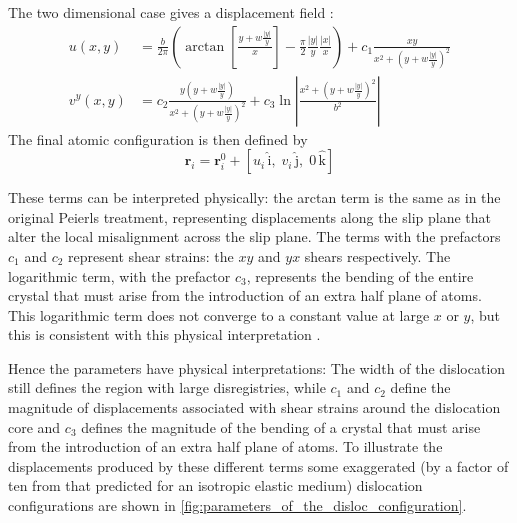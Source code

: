 The two dimensional case gives a displacement field \cite{Eshelby1949,Leibfried1949,nabarro1987theory}:
\begin{subequations}\label{eqn:displacements}
\begin{align}
u(x,y) &= \frac{b}{2\pi} \left( \arctan \left[ \frac{y +  w\frac{|y|}{y}}{x} \right] - \frac{\pi}{2} \frac{|y|}{y} \frac{|x|}{x} \right) + c_1 \frac{xy}{x^{2} + (y + w\frac{|y|}{y} )^2} \\
v^y(x,y) &= c_2 \frac{y(y +  w \frac{|y|}{y})}{x^2 + (y +  w \frac{|y|}{y})^2} + c_3 \ln \left| \frac{x^2 + (y +  w \frac{|y|}{y})^2}{b^2} \right|
\end{align}
\label{eqn:displacement_field}
\end{subequations}
The final atomic configuration is then defined by 
\begin{equation}
\bm{r}_i = \bm{r}_i^0 + [u_i\,\bm{\mathrm{\hat{i}}},\; v_i\,\bm{\mathrm{\hat{j}}},\; 0\,\bm{\mathrm{\hat{k}}}]
\end{equation}

These terms can be interpreted physically: the arctan term is the same as in the original Peierls treatment, representing displacements along the slip plane that alter the local misalignment across the slip plane. The terms with the prefactors $c_1$ and $c_2$ represent shear strains: the $xy$ and $yx$ shears respectively. The logarithmic term, with the prefactor $c_3$, represents the bending of the entire crystal that must arise from the introduction of an extra half plane of atoms. This logarithmic term does not converge to a constant value at large $x$ or $y$, but this is consistent with this physical interpretation \cite{hirth_lothe1982peierls_displacements}.

Hence the parameters have physical interpretations: The width of the dislocation still defines the region with large disregistries, while $c_1$ and $c_2$ define the magnitude of displacements associated with shear strains around the dislocation core and $c_3$ defines the magnitude of the bending of a crystal that must arise from the introduction of an extra half plane of atoms.
To illustrate the displacements produced by these different terms some exaggerated (by a factor of ten from that predicted for an isotropic elastic medium) dislocation configurations are shown in \autoref{fig:parameters_of_the_disloc_configuration}.




